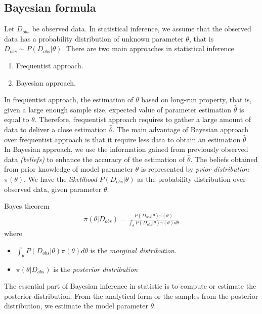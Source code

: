 \subsection{Bayesian formula}
Let $D_{obs}$ be observed data. In statistical inference, we assume that the observed data has a
probability distribution of unknown parameter $\theta$, that is $D_{obs} \sim P(D_{obs}|\theta)$. There are two main approaches in statistical inference
\begin{enumerate}
    \item Frequentist approach.
    \item Bayesian approach.
\end{enumerate}
In frequentist approach, the estimation of $\theta$ based on long-run property, that is, given a
large enough sample size, expected value of parameter estimation $\hat{\theta}$ is equal to
$\theta$. Therefore, frequentist approach requires to gather a large amount of data to deliver a
close estimation $\hat{\theta}$.  The main advantage of Bayesian approach over frequentist approach
is that it require less data to obtain an estimation $\hat{\theta}$.\\
In Bayesian approach, we use the information gained from previously observed data \textit{(beliefs)}
to enhance the accuracy of the estimation of $\hat{\theta}$. The beliefs obtained from prior
knowledge of model parameter $\theta$ is represented by \textit{prior distribution} $\pi(\theta)$.
We have the \textit{likelihood} $P(D_{obs}|\theta)$ as the probability distribution over observed
data, given parameter $\theta$.
\begin{definition}{Bayes theorem}
    \begin{align*}
        \pi(\theta | D_{obs}) = \frac{P(D_{obs}|\theta)\pi(\theta)}{\int_\theta P(D_{obs}|\theta)\pi(\theta)d\theta}
    \end{align*}
    where
    \begin{itemize}
        \item $\int_\theta P(D_{obs}|\theta)\pi(\theta)d\theta$ is the \textit{marginal distribution}.
        \item $\pi(\theta | D_{obs})$ is the \textit{posterior distribution}
    \end{itemize}
\end{definition}
The essential part of Bayesian inference in statistic is to compute or estimate the posterior
distribution. From the analytical form or the samples from the posterior distribution, we estimate
the model parameter $\theta$.

